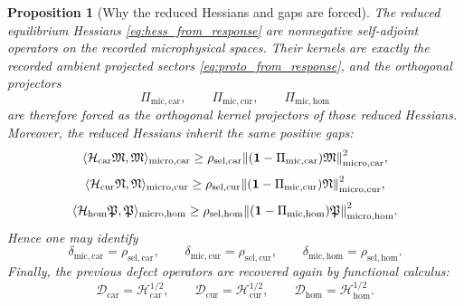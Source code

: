 \documentclass[11pt]{article}
\newcommand{\UltraTensor}{\mathfrak M}
\newcommand{\UltraRelabel}{\mathfrak N}
\newcommand{\UltraFree}{\mathfrak P}
\newcommand{\UltraCarProj}{\Pi_{\mathrm{mic,car}}}
\newcommand{\UltraCurProj}{\Pi_{\mathrm{mic,cur}}}
\newcommand{\UltraHomProj}{\Pi_{\mathrm{mic,hom}}}
\newcommand{\UltraCarGap}{\delta_{\mathrm{mic,car}}}
\newcommand{\UltraCurGap}{\delta_{\mathrm{mic,cur}}}
\newcommand{\UltraHomGap}{\delta_{\mathrm{mic,hom}}}
\newcommand{\TensorDefect}{\mathcal D_{\mathrm{car}}}
\newcommand{\CurDefect}{\mathcal D_{\mathrm{cur}}}
\newcommand{\HomDefect}{\mathcal D_{\mathrm{hom}}}
\newcommand{\TensorHess}{\mathcal H_{\mathrm{car}}}
\newcommand{\CurHess}{\mathcal H_{\mathrm{cur}}}
\newcommand{\HomHess}{\mathcal H_{\mathrm{hom}}}
\newcommand{\StemCarGap}{\rho_{\mathrm{sel,car}}}
\newcommand{\StemCurGap}{\rho_{\mathrm{sel,cur}}}
\newcommand{\StemHomGap}{\rho_{\mathrm{sel,hom}}}
\newtheorem{proposition}{Proposition}
\begin{document}
\begin{proposition}[Why the reduced Hessians and gaps are forced]
\label{prop:hess_gap_forced}
The reduced equilibrium Hessians \eqref{eq:hess_from_response} are nonnegative self-adjoint operators on the recorded microphysical spaces. Their kernels are exactly the recorded ambient projected sectors \eqref{eq:proto_from_response}, and the orthogonal projectors
\[
\UltraCarProj,\qquad
\UltraCurProj,\qquad
\UltraHomProj
\]
are therefore forced as the orthogonal kernel projectors of those reduced Hessians. Moreover, the reduced Hessians inherit the same positive gaps:
\begin{equation}
\langle \TensorHess\UltraTensor,\UltraTensor\rangle_{\mathrm{micro,car}}
\ge
\StemCarGap\norm{(\mathbf 1-\UltraCarProj)\UltraTensor}_{\mathrm{micro,car}}^2,
\label{eq:hess_gap_car}
\end{equation}
\begin{equation}
\langle \CurHess\UltraRelabel,\UltraRelabel\rangle_{\mathrm{micro,cur}}
\ge
\StemCurGap\norm{(\mathbf 1-\UltraCurProj)\UltraRelabel}_{\mathrm{micro,cur}}^2,
\label{eq:hess_gap_cur}
\end{equation}
\begin{equation}
\langle \HomHess\UltraFree,\UltraFree\rangle_{\mathrm{micro,hom}}
\ge
\StemHomGap\norm{(\mathbf 1-\UltraHomProj)\UltraFree}_{\mathrm{micro,hom}}^2.
\label{eq:hess_gap_hom}
\end{equation}
Hence one may identify
\begin{equation}
\UltraCarGap=\StemCarGap,\qquad
\UltraCurGap=\StemCurGap,\qquad
\UltraHomGap=\StemHomGap.
\label{eq:gaps_identified}
\end{equation}
Finally, the previous defect operators are recovered again by functional calculus:
\begin{equation}
\TensorDefect=\TensorHess^{1/2},\qquad
\CurDefect=\CurHess^{1/2},\qquad
\HomDefect=\HomHess^{1/2}.
\label{eq:defects_recovered_again}
\end{equation}
\end{proposition}
\end{document}
